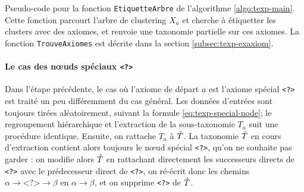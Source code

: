 \begin{algorithm}

\caption{Pseudo-code pour la fonction \texttt{EtiquetteArbre} de l'algorithme \ref{algo:texp-main}. Cette fonction parcourt l'arbre de clustering $X_a$ et cherche à étiquetter les clusters avec des axiomes, et renvoie une taxonomie partielle sur ces axiomes. La fonction \texttt{TrouveAxiomes} est décrite dans la section \ref{subsec:texp-exaxiom}.}
\label{algo:texp-trouve}
\end{algorithm}

\paragraph{Le cas des nœuds spéciaux \texttt{<?>}} 
Dans l'étape précédente, le cas où l'axiome de départ $a$ est l'axiome spécial \texttt{<?>} est traité un peu différemment du cas général. Les données d'entrées sont toujours tirées aléatoirement, suivant la formule \ref{eq:texp-special-node}; le regroupement hiérarchique et l'extraction de la sous-taxonomie $T_a$ suit une procédure identique. Ensuite, on rattache $T_a$ à $\hat{T}$. La taxonomie $\hat{T}$ en cours d'extraction contient alors toujours le nœud spécial \texttt{<?>}, qu'on ne souhaite pas garder : on modifie alors $\hat{T}$ en rattachant directement les successeurs directs de \texttt{<?>} avec le prédecesseur direct de \texttt{<?>}, on ré-écrit donc les chemins $\alpha \rightarrow \texttt{<?>} \rightarrow \beta$ en $\alpha \rightarrow \beta$, et on supprime \texttt{<?>} de $\hat{T}$.

